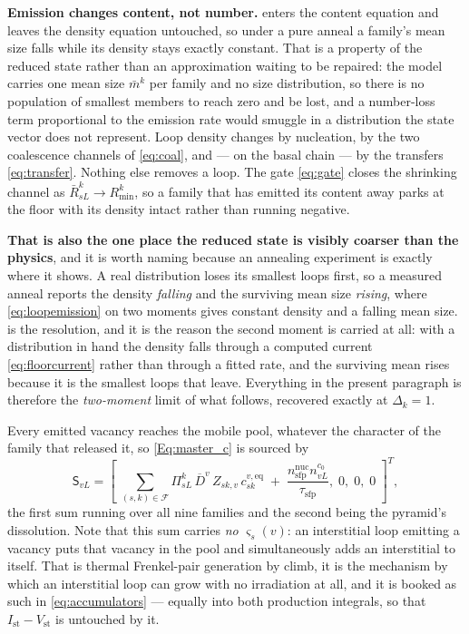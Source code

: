 \documentclass{article}
\newcommand{\spvec}[1]{\bm{\mathsf{#1}}}   %
\begin{document}
\textbf{Emission changes content, not number.}  enters the
content equation and leaves the density equation untouched, so under a pure
anneal a family's mean size falls while its density stays exactly constant. That
is a property of the reduced state rather than an approximation waiting to be
repaired: the model carries one mean size $\bar m^k$ per family and no size
distribution, so there is no population of smallest members to reach zero and be
lost, and a number-loss term proportional to the emission rate would smuggle in a
distribution the state vector does not represent. Loop density changes by
nucleation, by the two coalescence channels of \cref{eq:coal}, and --- on the
basal chain --- by the transfers \cref{eq:transfer}. Nothing else removes a loop.
The gate \cref{eq:gate} closes the shrinking channel as
$\bar R^k_{sL}\to R^k_{\min}$, so a family that has emitted its content away
parks at the floor with its density intact rather than running negative.

\textbf{That is also the one place the reduced state is visibly coarser than the
physics}, and it is worth naming because an annealing experiment is exactly where
it shows. A real distribution loses its smallest loops first, so a measured
anneal reports the density \emph{falling} and the surviving mean size
\emph{rising}, where \cref{eq:loopemission} on two moments gives constant density
and a falling mean size.  is the resolution, and it is the
reason the second moment is carried at all: with a distribution in hand the
density falls through a computed current \cref{eq:floorcurrent} rather than
through a fitted rate, and the surviving mean rises because it is the smallest
loops that leave. Everything in the present paragraph is therefore the
\emph{two-moment} limit of what follows, recovered exactly at $\Delta_k=1$.

Every emitted vacancy reaches the mobile pool, whatever the character of the
family that released it, so \cref{Eq:master_c} is sourced by
\begin{equation}
  \spvec S_{vL}=\left[\;\sum_{(s,k)\in\mathcal F}
     \Pi^k_{sL}\,\overline D^{v}\,Z_{sk,v}\,c^{v,\mathrm{eq}}_{sk}
     \;+\;\frac{n^{\mathrm{nuc}}_{\mathrm{sfp}}n^{c_0}_{vL}}{\tau_{\mathrm{sfp}}}
     ,\;0,\;0,\;0\;\right]^{T},
  \label{eq:Semit}
\end{equation}
the first sum running over all nine families and the second being the pyramid's
dissolution. Note that this sum carries \emph{no} $\varsigma_s(v)$: an
interstitial loop emitting a vacancy puts that vacancy in the pool and
simultaneously adds an interstitial to itself. That is thermal Frenkel-pair
generation by climb, it is the mechanism by which an interstitial loop can grow
with no irradiation at all, and it is booked as such in \cref{eq:accumulators}
--- equally into both production integrals, so that
$I_{\mathrm{st}}-V_{\mathrm{st}}$ is untouched by it.
\end{document}
